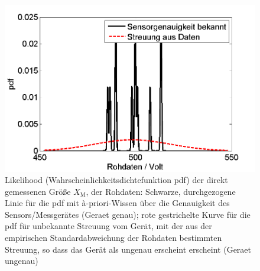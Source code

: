 \begin{figure}[!htp]
	\begin{center}
		\includegraphics[width=120mm]{11_vorlesung_GUMS1/media/Rohdaten.png}
		\caption{Likelihood (Wahrscheinlichkeitsdichtefunktion pdf)
		der direkt gemessenen Größe $X_\mathrm{M}$, der Rohdaten: Schwarze, durchgezogene Linie
		für die pdf mit {\`a}-priori-Wissen über die Genauigkeit des Sensors/Messgerätes
		(\glqq Geraet genau\grqq);
		rote gestrichelte Kurve für die pdf für unbekannte Streuung vom Gerät,
		mit der aus der empirischen Standardabweichung der Rohdaten
		bestimmten Streuung, so dass das Gerät als ungenau erscheint erscheint (\glqq Geraet ungenau\grqq)}
		\label{fig:Rohdaten}
	\end{center}
\end{figure}
\newpage

